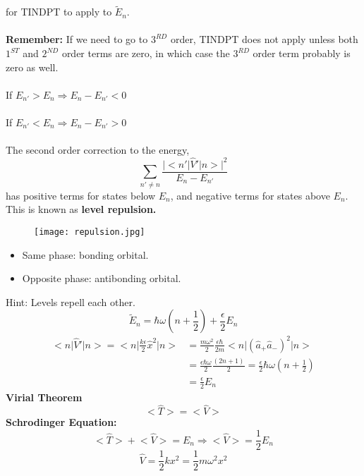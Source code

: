 \documentclass[12pt,fancychapters]{report}
\numberwithin{equation}{section}
\begin{document}
for TINDPT to apply to $\tilde{E}_n$.\\
\\
\textbf{Remember:} If we need to go to $3^{RD}$ order, TINDPT does not apply unless both $1^{ST}$
and $2^{ND}$ order terms are zero, in which case the $3^{RD}$ order term probably is zero as well.\\
\\
If $E_{n'}>E_n \Longrightarrow E_n - E_{n'}<0$\\
\\
If $E_{n'}<E_n \Longrightarrow E_n - E_{n'}>0$\\
\\
The second order correction to the energy,
\begin{equation*}
	\sum_{n'\neq n}\frac{\big|\big<
	n'\big|\hat{V}'\big|n\big>\big|^2}{E_n - E_{n'}}
\end{equation*}
has positive terms for states below $E_n$, and negative terms for states above $E_n$. This is known
as \textbf{level repulsion.}
\begin{figure}[H]
  \centering
	\texttt{[image: repulsion.jpg]}
\end{figure}
\begin{itemize}
	\item Same phase: bonding orbital.
	\item Opposite phase: antibonding orbital.
	\end{itemize}
Hint: Levels repell each other.
\begin{equation*}
	\tilde{E}_n = \hbar\omega\left(n+\frac{1}{2}\right)+\frac{\epsilon}{2}E_n
\end{equation*}
\begin{align*}
	\big<n\big|\hat{V}'\big|n\big> = \Bigg<n\Bigg|\frac{k\epsilon}{2}\hat{x}^2\Bigg|n\Bigg>
	& = \frac{m\omega^2}{2}\frac{\epsilon \hbar}{2m}\big<n\big|(\hat{a}_+\hat{a}_-)^2\big|n\big>\\
	& = \frac{\epsilon\hbar\omega}{2}\frac{(2n+1)}{2} = \frac{\epsilon}{2}\hbar\omega\left(n+\frac{1}{2}\right)\\
	& = \frac{\epsilon}{2}E_n
\end{align*}
\textbf{Virial Theorem}
\begin{equation*}
	\big<\hat{T}\big> = \big<\hat{V}\big>
\end{equation*}
\textbf{Schrodinger Equation:}
\begin{equation*}
	\big<\hat{T}\big>+\big<\hat{V}\big> = E_n \Longrightarrow \big<\hat{V}\big> = \frac{1}{2}E_n
\end{equation*}
\begin{equation*}
	\hat{V} = \frac{1}{2}kx^2 = \frac{1}{2}m\omega^2x^2
\end{equation*}
\end{document}
